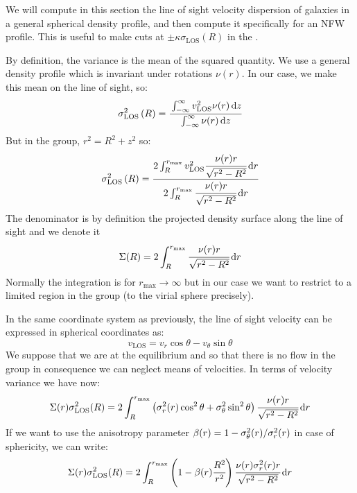 We will compute in this section the line of sight velocity dispersion of
galaxies in a general spherical density profile, and then compute it
specifically for an NFW profile. This is useful to make cuts at
$\pm\kappa\sigma_\mathrm{LOS} \left(R\right)$ in the \pps{}.

By definition, the variance is the mean of the squared quantity. We use a
general density profile which is invariant under rotations $\nu{(r)}$. In our
case, we make this mean on the line of sight, so:
%
\begin{equation}
    \sigma_\mathrm{LOS}^2\left({R}\right)=
    \cfrac{\int_{-\infty}^{\infty}{v_\mathrm{LOS}^2}\nu{(r)}\,{\rm{d}}{z}}
    {\int_{-\infty}^{\infty}\nu{(r)}\,{\rm{d}}{z}}
\end{equation}
%
But in the group, $r^2=R^2+z^2$ so:
%
\begin{equation}
    \sigma_\mathrm{LOS}^2\left({R}\right)=
    \cfrac{2\int_{R}^{r_{\max}}{v_\mathrm{LOS}^2}
    \cfrac{\nu{(r)}{r}}{\sqrt{r^2-R^2}}\,{\rm{d}}{r}}
    {2\int_{R}^{r_{\max}}\cfrac{\nu{(r)}{r}}{\sqrt{r^2-R^2}}\,{\rm{d}}{r}}
\end{equation}
%
The denominator is by definition the projected density surface along the line
of sight and we denote it
%
\begin{equation}
    \Sigma(R) = 2\int_{R}^{r_{\max}}\cfrac{\nu{(r)}{r}}{\sqrt{r^2-R^2}}\,{\rm{d}}{r}
\end{equation}
%
Normally the integration is for $r_{\max}\rightarrow\infty$ but in our case we
want to restrict to a limited region in the group (to the virial sphere
precisely).

In the same coordinate system as previously, the line of sight velocity can be
expressed in spherical coordinates as:
%
\begin{equation}
    v_{\mathrm{LOS}} = v_r \cos\theta - v_\theta \sin\theta
\end{equation}
%
We suppose that we are at the equilibrium and so that there is no flow in the
group in consequence we can neglect means of velocities. In terms of velocity
variance we have now:
%
\begin{equation}
    \Sigma(r)\sigma_{\mathrm{LOS}}^2(R) = 2\int_R^{r_{\max}}
    \left({\sigma_r^2(r)\cos^2\theta+\sigma_\theta^2\sin^2\theta}\right)
    \cfrac{\nu{(r)}{r}}{\sqrt{r^2-R^2}}\,{\rm{d}}{r}
\end{equation}
%
If we want to use the anisotropy parameter
$\beta(r)=1-\sigma_\theta^2(r)/\sigma_r^2(r)$ in case of sphericity, we can
write:
%
\begin{equation}
    \Sigma(r)\sigma_{\mathrm{LOS}}^2(R) = 2\int_R^{r_{\max}}
    \left({1-\beta(r)\cfrac{R^2}{r^2}}\right)
    \cfrac{\nu{(r)}{\sigma_r^2(r)}{r}}{\sqrt{r^2-R^2}}\,{\rm{d}}{r}
\end{equation}

